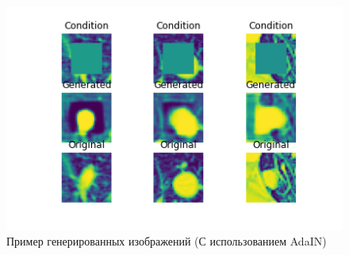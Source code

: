 \begin{figure}[!h]
\includegraphics[width=\linewidth]{images/adain.png}
\caption{Пример генерированных изображений (С использованием AdaIN)}\label{cgan-adain-results}
\centering
\end{figure}